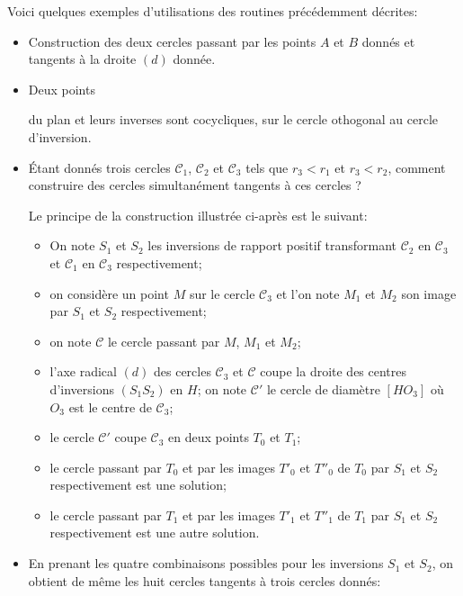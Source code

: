 \documentclass[pdftex]{article}
\begin{document}
Voici quelques exemples d'utilisations des routines précédemment décrites:
\begin{itemize}
\item Construction des deux cercles passant par les points $A$ et $B$
  donnés et tangents à la droite $(d)$ donnée.
\item \hypertarget{exemple_inversion}{Deux points} du plan et leurs inverses sont cocycliques,
  sur le cercle othogonal au cercle d'inversion.
\item Étant donnés trois cercles $\mathscr{C}_{1}$,
  $\mathscr{C}_{2}$ et $\mathscr{C}_{3}$ tels que $r_{3}<r_{1}$ et
  $r_{3}<r_{2}$, comment construire des cercles simultanément tangents à ces
  cercles ?

  Le principe de la construction illustrée ci-après est le suivant:
  \begin{itemize}
  \item On note $S_{1}$ et $S_{2}$ les inversions de rapport positif
    transformant $\mathscr{C}_{2}$ en $\mathscr{C}_{3}$ et $\mathscr{C}_{1}$ en
    $\mathscr{C}_{3}$ respectivement;
  \item on considère un point $M$ sur le cercle $\mathscr{C}_{3}$ et
    l'on note $M_{1}$ et $M_{2}$ son image par $S_{1}$ et $S_{2}$ respectivement;
  \item on note $\mathscr{C}$ le cercle passant par $M$, $M_{1}$ et $M_{2}$;
  \item l'axe radical $(d)$ des cercles $\mathscr{C}_{3}$ et
    $\mathscr{C}$ coupe la droite des centres d'inversions
    $(S_{1}S_{2})$ en $H$; on note $\mathscr{C'}$ le cercle de
    diamètre $\left[HO_{3}\right]$ où $O_{3}$ est le centre de $\mathscr{C}_{3}$;
  \item le cercle $\mathscr{C'}$ coupe $\mathscr{C}_{3}$ en deux
    points $T_{0}$ et $T_{1}$;
  \item le cercle passant par $T_{0}$ et par les images $T'_{0}$ et
    $T''_{0}$ de $T_{0}$ par $S_{1}$ et $S_{2}$ respectivement est une
    solution;
  \item le cercle passant par $T_{1}$ et par les images $T'_{1}$ et
    $T''_{1}$ de $T_{1}$ par $S_{1}$ et $S_{2}$ respectivement est une
    autre solution.
  \end{itemize}
\item En prenant les quatre combinaisons possibles pour les inversions
  $S_{1}$ et $S_{2}$, on obtient de même les huit cercles tangents à trois
  cercles donnés:
\end{itemize}
\end{document}
